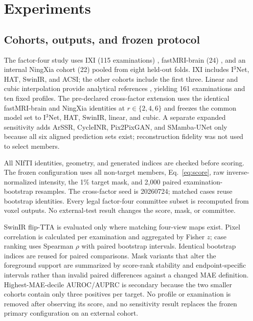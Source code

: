 \documentclass{article}
\begin{document}
\section{Experiments}
\subsection{Cohorts, outputs, and frozen protocol}
The factor-four study uses IXI (115 examinations) \cite{ixi}, fastMRI-brain (24) \cite{zbontar2018fastmri}, and an internal NingXia cohort (22) pooled from eight held-out folds. IXI includes I$^3$Net, HAT, SwinIR, and ACSI; the other cohorts include the first three. Linear and cubic interpolation provide analytical references \cite{keys1981cubic,thevenaz2000interpolation,unser1999splines}, yielding 161 examinations and ten fixed profiles. The pre-declared cross-factor extension uses the identical fastMRI-brain and NingXia identities at $r\in\{2,4,6\}$ and freezes the common model set to I$^3$Net, HAT, SwinIR, linear, and cubic. A separate expanded sensitivity adds ArSSR, CycleINR, Pix2PixGAN, and SMamba-UNet only because all six aligned prediction sets exist; reconstruction fidelity was not used to select members.

\begin{table}[H]
 \centering
 \caption{Cohorts and stored neural outputs. Analytical references are available for every profile.}
 \resizebox{\columnwidth}{!}{}
 \label{tab:protocol}
\end{table}

All NIfTI identities, geometry, and generated indices are checked before scoring. The frozen configuration uses all non-target members, Eq.~\eqref{eq:score}, raw inverse-normalized intensity, the 1\% target mask, and 2,000 paired examination-bootstrap resamples. The cross-factor seed is 20260724; matched cases reuse bootstrap identities. Every legal factor-four committee subset is recomputed from voxel outputs. No external-test result changes the score, mask, or committee.

SwinIR flip-TTA is evaluated only where matching four-view maps exist. Pixel correlation is calculated per examination and aggregated by Fisher $z$; case ranking uses Spearman $\rho$ with paired bootstrap intervals. Identical bootstrap indices are reused for paired comparisons. Mask variants that alter the foreground support are summarized by score-rank stability and endpoint-specific intervals rather than invalid paired differences against a changed MAE definition. Highest-MAE-decile AUROC/AUPRC is secondary because the two smaller cohorts contain only three positives per target. No profile or examination is removed after observing its score, and no sensitivity result replaces the frozen primary configuration on an external cohort.
\end{document}
